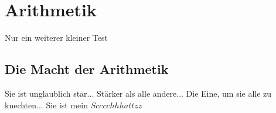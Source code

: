 \chapter{Arithmetik}
Nur ein weiterer kleiner Test\\
\section{Die Macht der Arithmetik}
Sie ist unglaublich star... Stärker als alle andere... Die Eine, um sie alle zu knechten... Sie ist mein $Scccchhhattzz$
